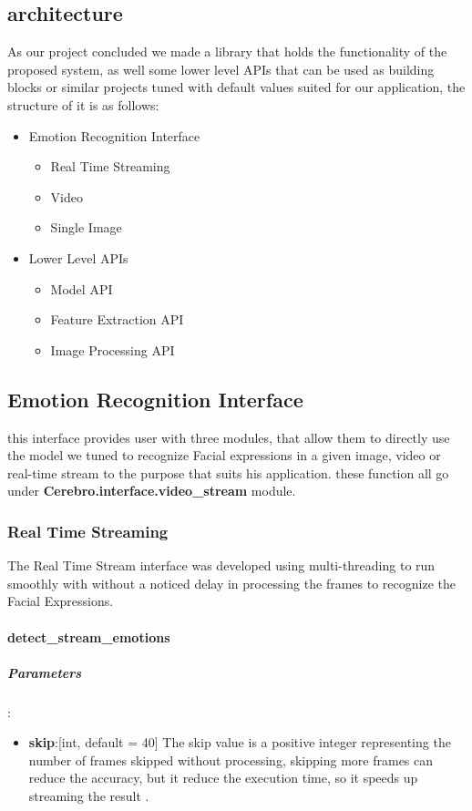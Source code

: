 \subsection{architecture}
As our project concluded we made a library that holds the functionality of the proposed system, as well some lower level APIs that can be used as building blocks or similar projects tuned with default values suited for our application, the structure of it is as follows:
\begin{itemize}
	\item Emotion Recognition Interface 
	\begin{itemize}[noitemsep,nolistsep]
		\item Real Time Streaming
		\item Video
		\item Single Image
	\end{itemize}
	\item Lower Level APIs
	\begin{itemize}[noitemsep,nolistsep]
		\item Model API
		\item Feature Extraction API
		\item Image Processing API
	\end{itemize}
\end{itemize}

\subsection{Emotion Recognition Interface}
this interface provides user with three modules, that allow them to directly use the model we tuned to recognize Facial expressions in a given image, video or real-time stream to the purpose that suits his application.\newline
these function all go under \textbf{Cerebro.interface.video\_stream} module.

\subsubsection{Real Time Streaming}
The Real Time Stream interface was developed using multi-threading to run smoothly with without a noticed delay in processing the frames to recognize the Facial Expressions. 

\paragraph{detect\_stream\_emotions}%
\subparagraph{Parameters}:
\begin{changemargin}{0.5cm}{0cm}
	\begin{itemize}[noitemsep,nolistsep]
		\item\textbf{skip}:[int, default = 40] The skip value is a positive integer representing the number of frames skipped without processing, skipping more frames can reduce the accuracy, but it reduce the execution time, so it speeds up streaming the result .
	\end{itemize}
\end{changemargin}

